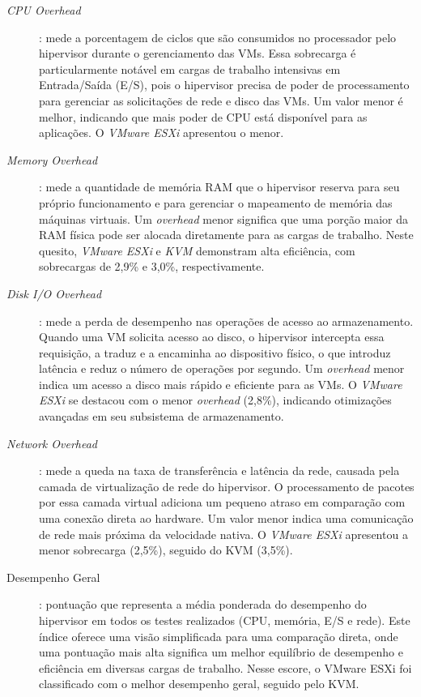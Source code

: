 \begin{description}
    \item[\textit{CPU Overhead}]:  mede a porcentagem de ciclos que são consumidos no processador pelo hipervisor durante o gerenciamento das VMs. Essa sobrecarga é particularmente notável em cargas de trabalho intensivas em Entrada/Saída (E/S), pois o hipervisor precisa de poder de processamento para gerenciar as solicitações de rede e disco das VMs. Um valor menor é melhor, indicando que mais poder de CPU está disponível para as aplicações. O \textit{VMware ESXi} apresentou o menor.
    \item[\textit{Memory Overhead}]:  mede a quantidade de memória RAM que o hipervisor reserva para seu próprio funcionamento e para gerenciar o mapeamento de memória das máquinas virtuais. Um \textit{overhead} menor significa que uma porção maior da RAM física pode ser alocada diretamente para as cargas de trabalho. Neste quesito, \textit{VMware ESXi} e \textit{KVM} demonstram alta eficiência, com sobrecargas de 2,9\% e 3,0\%, respectivamente.
    \item[\textit{Disk I/O Overhead}]: mede a perda de desempenho nas operações de acesso ao armazenamento. Quando uma VM solicita acesso ao disco, o hipervisor intercepta essa requisição, a traduz e a encaminha ao dispositivo físico, o que introduz latência e reduz o número de operações por segundo. Um \textit{overhead} menor indica um acesso a disco mais rápido e eficiente para as VMs. O \textit{VMware ESXi} se destacou com o menor \textit{overhead} (2,8\%), indicando otimizações avançadas em seu subsistema de armazenamento.
    \item[\textit{Network Overhead}]: mede a queda na taxa de transferência e latência da rede, causada pela camada de virtualização de rede do hipervisor. O processamento de pacotes por essa camada virtual adiciona um pequeno atraso em comparação com uma conexão direta ao hardware. Um valor menor indica uma comunicação de rede mais próxima da velocidade nativa. O \textit{VMware ESXi} apresentou a menor sobrecarga (2,5\%), seguido do KVM (3,5\%).
    \item[Desempenho Geral]: pontuação que representa a média ponderada do desempenho do hipervisor em todos os testes realizados (CPU, memória, E/S e rede). Este índice oferece uma visão simplificada para uma comparação direta, onde uma pontuação mais alta significa um melhor equilíbrio de desempenho e eficiência em diversas cargas de trabalho. Nesse escore, o VMware ESXi foi classificado com o melhor desempenho geral, seguido pelo KVM.









\end{description}

